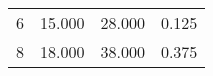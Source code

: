 % 
\begin{tabular}{cccc}
  \hline
  \hline
6 & 15.000 & 28.000 & 0.125 \\ 
  8 & 18.000 & 38.000 & 0.375 \\ 
   \hline
\end{tabular}
